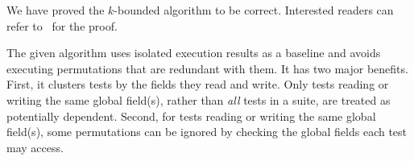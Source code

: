 We have proved the \dependenceaware{} $k$-bounded algorithm to be
correct. Interested
readers can refer to~\cite{proof-dependence-aware} for the proof.

The given algorithm uses isolated execution results as a baseline and
avoids executing permutations that are redundant with them.
%
It has two major benefits.
First, it clusters tests by the fields they
read and write. Only tests reading or writing
the same global field(s), rather than \textit{all} tests
in a suite, are treated as potentially dependent.
Second, for tests reading or writing the same global
field(s), some permutations can be ignored by checking
the global fields each test may access. 










